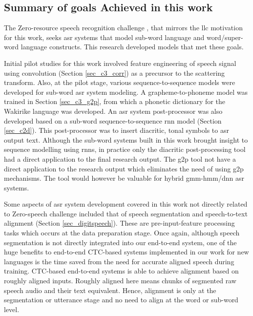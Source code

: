 \subsection{Summary of goals Achieved in this work}
The Zero-resource speech recognition challenge \citep{versteegh2015zero}, that mirrors the \acrlong{llc} motivation for this work, seeks \acrshort{asr} systems that model sub-word language and word/super-word language constructs.  This research developed models that met these goals.

Initial pilot studies for this work involved feature engineering of speech signal using convolution (Section \ref{sec_c3_corr}) as a precursor to the scattering transform.  Also, at the pilot stage, various sequence-to-sequence models were developed for sub-word \acrshort{asr} system modeling.  A grapheme-to-phoneme model was trained in Section \ref{sec_c3_g2p}, from which a phonetic dictionary for the Wakirike language was developed. An \acrshort{asr} system post-processor was also developed based on a sub-word sequence-to-sequence \acrshort{rnn} model (Section \ref{sec_c2d}).  This post-processor was to insert diacritic, tonal symbols to \acrshort{asr} output text.  Although the sub-word systems built in this work brought insight to sequence modelling using \acrfull{rnn}s, in practice only the diacritic post-processing tool had a direct application to the final research output.  The \acrfull{g2p} tool   not have a direct application to the research output which eliminates the need of using \acrshort{g2p} mechanisms.  The tool would however be valuable for hybrid \acrshort{gmm}-\acrshort{hmm}/\acrshort{dnn} \acrshort{asr} systems.

Some aspects of \acrshort{asr} system development covered in this work not directly related to Zero-speech challenge included that of speech segmentation and speech-to-text alignment (Section \ref{sec_digitspeech}).  These are pre-input-feature processing tasks which occurs at the data preparation stage.  Once again, although speech segmentation is not directly integrated into our end-to-end system, one of the huge benefits to end-to-end CTC-based systems implemented in our work for new languages is the time saved from the need for accurate aligned speech during training.  CTC-based end-to-end systems is able to achieve alignment based on roughly aligned inputs.  Roughly aligned here means chunks of segmented raw speech audio and their text equivalent.  Hence, alignment is only at the segmentation or utterance stage and no need to align at the word or sub-word level.

